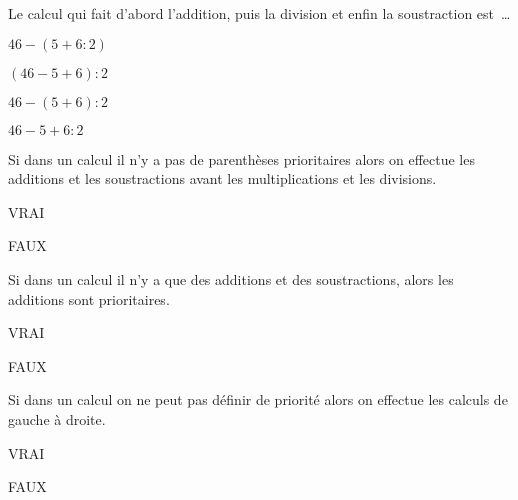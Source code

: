 \begin{QCM}
\begin{GroupeQCM}
\begin{exercice}
      Le calcul qui fait d'abord  l'addition, puis la division et enfin la soustraction est \ldots
      \begin{ChoixQCM}{4}
      \item $46 - (5 + 6 : 2)$
      \item $(46 - 5 + 6) : 2$
      \item $46 - (5 + 6) : 2$
      \item $46 - 5 + 6 : 2$
      \end{ChoixQCM}
\begin{corrige}
   \end{corrige}
    \end{exercice}
    
\begin{exercice}
      Si dans un calcul il n'y a pas de parenthèses prioritaires alors on effectue les additions et les soustractions avant les multiplications et les divisions.
      \begin{ChoixQCM}{4}
      \item VRAI
      \item FAUX
      \end{ChoixQCM}
\begin{corrige}
   \end{corrige}
    \end{exercice}
    
\begin{exercice}
      Si dans un calcul il n'y a que des additions et des soustractions, alors les additions sont prioritaires.
      \begin{ChoixQCM}{4}
      \item VRAI
      \item FAUX
      \end{ChoixQCM}
\begin{corrige}
   \end{corrige}
    \end{exercice}
    
\begin{exercice}
      Si dans un calcul on ne peut pas définir de priorité alors on effectue les calculs de gauche à droite.
      \begin{ChoixQCM}{4}
      \item VRAI
      \item FAUX
      \end{ChoixQCM}
\begin{corrige}
   \end{corrige}
    \end{exercice}

\end{GroupeQCM}
\end{QCM}

  